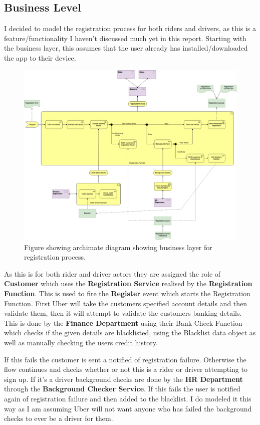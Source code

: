 \documentclass{article}
\begin{document}
    \subsection{Business Level}
    I decided to model the registration process for both riders and drivers, as this is a feature/functionality I haven't discussed much yet in this report.
    Starting with the business layer, this assumes that the user already has installed/downloaded the app to their device.
    \begin{figure}[H]
      \centering
      \captionsetup{justification=centering}
      \includegraphics[width=12cm]{assets/arch_bus.drawio.png}
      \caption{Figure showing archimate diagram showing business layer for registration process.}
      \label{fig:archimateBusLayer}
    \end{figure}

    \newpage
    As this is for both rider and driver actors they are assigned the role of \textbf{Customer} which uses the \textbf{Registration Service}
    realised by the \textbf{Registration Function}. This is used to fire the \textbf{Register} event which starts the Registration Function.
    First Uber will take the customers specified account details and then validate them, then it will attempt to validate the customers banking details.
    This is done by the \textbf{Finance Department} using their Bank Check Function which checks if the given details are blacklisted, using the Blacklist data object
    as well as manually checking the users credit history.

    If this fails the customer is sent a notified of registration failure. Otherwise the flow continues and checks whether or not this is a
    rider or driver attempting to sign up. If it's a driver background checks are done by the \textbf{HR Department} through the \textbf{Background Checker Service}.
    If this fails the user is notified again of registration failure and then added to the blacklist. I do modeled it this way as I am assuming
    Uber will not want anyone who has failed the background checks to ever be a driver for them.
\end{document}
